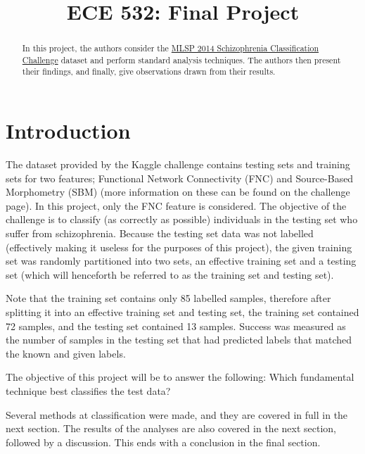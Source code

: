 \documentclass{article}
\title{ECE 532: Final Project}
\begin{document}
\maketitle

\begin{abstract}
    In this project, the authors consider the \href{https://www.kaggle.com/c/mlsp-2014-mri}{MLSP 2014 Schizophrenia Classification Challenge} dataset and perform standard analysis techniques. The authors then present their findings, and finally, give observations drawn from their results.
\end{abstract}
\raggedbottom %

\section{Introduction}
The dataset provided by the Kaggle challenge contains testing sets and training sets for two features; Functional Network Connectivity (FNC) and Source-Based Morphometry (SBM) (more information on these can be found on the challenge page). In this project, only the FNC feature is considered. The objective of the challenge is to classify (as correctly as possible) individuals in the testing set who suffer from schizophrenia. Because the testing set data was not labelled (effectively making it useless for the purposes of this project), the given training set was randomly partitioned into two sets, an effective training set and a testing set (which will henceforth be referred to as the training set and testing set).

Note that the training set contains only 85 labelled samples, therefore after splitting it into an effective training set and testing set, the training set contained 72 samples, and the testing set contained 13 samples. Success was measured as the number of samples in the testing set that had predicted labels that matched the known and given labels. 

The objective of this project will be to answer the following: Which fundamental technique best classifies the test data?


Several methods at classification were made, and they are covered in full in the next section. The results of the analyses are also covered in the next section, followed by a discussion. This ends with a conclusion in the final section.
\end{document}
